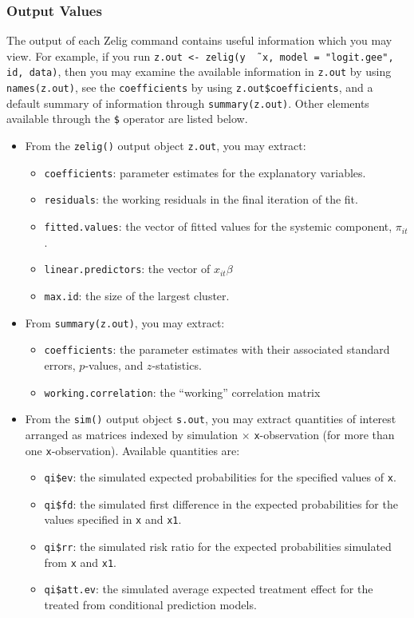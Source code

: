\subsubsection{Output Values}

The output of each Zelig command contains useful information which you
may view.  For example, if you run \texttt{z.out <- zelig(y \~\, x,
  model = "logit.gee", id, data)}, then you may examine the available
information in \texttt{z.out} by using \texttt{names(z.out)},
see the {\tt coefficients} by using {\tt z.out\$coefficients}, and
a default summary of information through \texttt{summary(z.out)}.
Other elements available through the {\tt \$} operator are listed
below.

\begin{itemize}
\item From the {\tt zelig()} output object {\tt z.out}, you may
  extract:
   \begin{itemize}
   \item {\tt coefficients}: parameter estimates for the explanatory
     variables.
   \item {\tt residuals}: the working residuals in the final iteration
     of the fit.
   \item {\tt fitted.values}: the vector of fitted values for the
     systemic component, $\pi_{it}$.
   \item {\tt linear.predictors}: the vector of $x_{it}\beta$
   \item {\tt max.id}: the size of the largest cluster.
   \end{itemize}

\item From {\tt summary(z.out)}, you may extract:
   \begin{itemize}
   \item {\tt coefficients}: the parameter estimates with their
     associated standard errors, $p$-values, and $z$-statistics.
   \item {\tt working.correlation}: the ``working'' correlation matrix
   \end{itemize}

\item From the {\tt sim()} output object {\tt s.out}, you may extract
  quantities of interest arranged as matrices indexed by simulation
  $\times$ {\tt x}-observation (for more than one {\tt x}-observation).
  Available quantities are:

   \begin{itemize}
   \item {\tt qi\$ev}: the simulated expected probabilities for the
     specified values of {\tt x}.
   \item {\tt qi\$fd}: the simulated first difference in the expected
     probabilities for the values specified in {\tt x} and {\tt x1}.
   \item {\tt qi\$rr}: the simulated risk ratio for the expected
     probabilities simulated from {\tt x} and {\tt x1}.
   \item {\tt qi\$att.ev}: the simulated average expected treatment
     effect for the treated from conditional prediction models.
   \end{itemize}
\end{itemize}

